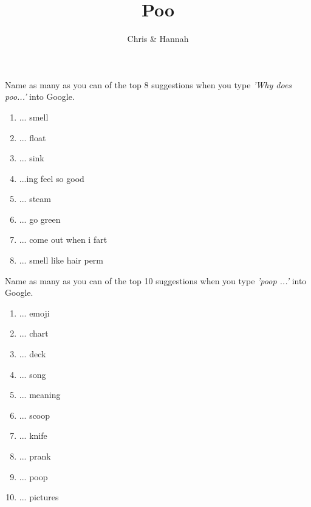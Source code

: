 \documentclass[answers]{exam}
\title{Poo\vspace{-2ex}}
\author{Chris \& Hannah\vspace{-2ex}}
\begin{document}
\maketitle
\vspace{5mm}

\begin{questions}

    \question Name as many as you can of the top 8 suggestions when you type \emph{'Why does poo...'} into Google.
    
    \begin{solution}
        \begin{enumerate}
            \item ... smell
            \item ... float
            \item ... sink
            \item ...ing feel so good
            \item ... steam
            \item ... go green
            \item ... come out when i fart
            \item ... smell like hair perm
        \end{enumerate}
    \end{solution}

    \question Name as many as you can of the top 10 suggestions when you type \emph{'poop ...'} into Google.
    
    \begin{solution}
        \begin{enumerate}
            \item ... emoji
            \item ... chart
            \item ... deck
            \item ... song
            \item ... meaning
            \item ... scoop
            \item ... knife
            \item ... prank
            \item ... poop
            \item ... pictures
        \end{enumerate}
    \end{solution}

\end{questions}
\end{document}

